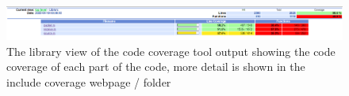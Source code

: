\documentclass[11pt,a4paper]{article}
\begin{document}
\begin{figure}[H]
	\begin{turn}{90}
		\begin{minipage}[c][\textwidth][c]{\textheight}
			\centering
			\includegraphics[width=\textwidth]{code-coverage}
			\caption{The library view of the code coverage tool output showing the code coverage of each part of the code, more detail is shown in the include coverage webpage / folder}
			\label{GRCOV_TOP_LEVEL}
		\end{minipage}
	\end{turn}
\end{figure}
\end{document}
